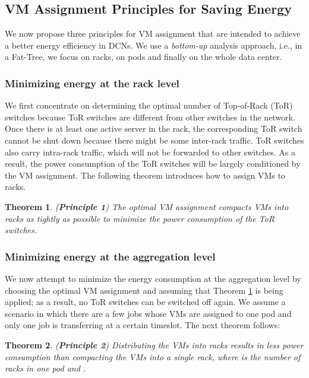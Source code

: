 \documentclass[journal,single-space,two column,twoside,10pt]{IEEEtran}
\newtheorem{theorem}{Theorem}
\begin{document}
\subsection{VM Assignment Principles for Saving Energy}
\label{sec:principles}

We now propose three principles for VM assignment that are intended to achieve a better energy efficiency in DCNs. We use a \emph{bottom-up} analysis approach, i.e., in a Fat-Tree, we focus on racks, on pods and finally on the whole data center.

\subsubsection{Minimizing energy at the rack level}

We first concentrate on determining the optimal number of Top-of-Rack (ToR) switches because ToR switches are different from other switches in the network. Once there is at least one active server in the rack, the corresponding ToR switch cannot be shut down because there might be some inter-rack traffic. ToR switches also carry intra-rack traffic, which will not be forwarded to other switches. As a result, the power consumption of the ToR switches will be largely conditioned by the VM assignment. The following theorem introduces how to assign VMs to racks.
\begin{theorem}
\label{theo:princ1}
(\textbf{Principle 1}) The optimal VM assignment compacts VMs into racks as tightly as possible to minimize the power consumption of the ToR switches.
\end{theorem}

\subsubsection{Minimizing energy at the aggregation level}

We now attempt to minimize the energy consumption at the aggregation level by choosing the optimal VM assignment and assuming that Theorem \ref{theo:princ1} is being applied; as a result, no ToR switches can be switched off again.
We assume a scenario in which there are a few jobs whose VMs are assigned to one pod and only one job is transferring at a certain timeslot. The next theorem follows:
\begin{theorem}
\label{theo:prin2}
(\textbf{Principle 2}) Distributing the VMs into  racks results in less power consumption than compacting the VMs into a single rack, where  is the number of racks in one pod and .
\end{theorem}
\end{document}
